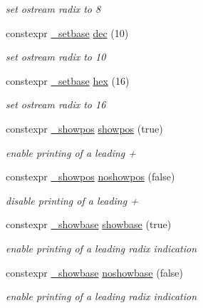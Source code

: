 \begin{DoxyCompactItemize}
\begin{DoxyCompactList}\small\item\em set ostream radix to 8 \end{DoxyCompactList}\item 
constexpr \hyperlink{structhwlib_1_1__setbase}{\+\_\+setbase} \hyperlink{namespacehwlib_ab8f3a2357c88d53861c09dbd17f14f1b}{dec} (10)
\begin{DoxyCompactList}\small\item\em set ostream radix to 10 \end{DoxyCompactList}\item 
constexpr \hyperlink{structhwlib_1_1__setbase}{\+\_\+setbase} \hyperlink{namespacehwlib_a4726c8f4bef5591b6f6853041328a04f}{hex} (16)
\begin{DoxyCompactList}\small\item\em set ostream radix to 16 \end{DoxyCompactList}\item 
constexpr \hyperlink{structhwlib_1_1__showpos}{\+\_\+showpos} \hyperlink{namespacehwlib_a7bb9927f52011b4cc4a90b03e98f95fd}{showpos} (true)
\begin{DoxyCompactList}\small\item\em enable printing of a leading \textquotesingle{}+\textquotesingle{} \end{DoxyCompactList}\item 
constexpr \hyperlink{structhwlib_1_1__showpos}{\+\_\+showpos} \hyperlink{namespacehwlib_accdd72e1358d667a9458767d886b2a53}{noshowpos} (false)
\begin{DoxyCompactList}\small\item\em disable printing of a leading \textquotesingle{}+\textquotesingle{} \end{DoxyCompactList}\item 
constexpr \hyperlink{structhwlib_1_1__showbase}{\+\_\+showbase} \hyperlink{namespacehwlib_a84adb21b2d054d3b70c6b26af5f44566}{showbase} (true)
\begin{DoxyCompactList}\small\item\em enable printing of a leading radix indication \end{DoxyCompactList}\item 
constexpr \hyperlink{structhwlib_1_1__showbase}{\+\_\+showbase} \hyperlink{namespacehwlib_af813ae25dc70ae85e2f06dcf81f8963b}{noshowbase} (false)
\begin{DoxyCompactList}\small\item\em enable printing of a leading radix indication \end{DoxyCompactList}\item 

\end{DoxyCompactItemize}
